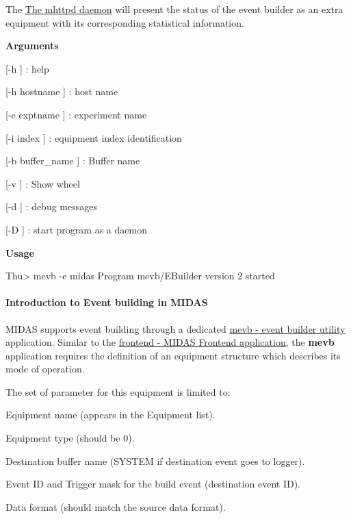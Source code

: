 The \hyperlink{RC_mhttpd_utility}{The mhttpd daemon} will present the status of the event builder as an extra equipment with its corresponding statistical information.


\begin{DoxyItemize}
\item {\bfseries  Arguments }
\begin{DoxyItemize}
\item \mbox{[}-\/h \mbox{]} : help
\item \mbox{[}-\/h hostname \mbox{]} : host name
\item \mbox{[}-\/e exptname \mbox{]} : experiment name
\item \mbox{[}-\/i index \mbox{]} : equipment index identification
\item \mbox{[}-\/b buffer\_\-name \mbox{]} : Buffer name
\item \mbox{[}-\/v \mbox{]} : Show wheel
\item \mbox{[}-\/d \mbox{]} : debug messages
\item \mbox{[}-\/D \mbox{]} : start program as a daemon
\end{DoxyItemize}
\item {\bfseries  Usage } 
\begin{DoxyCode}
  Thu> mevb -e midas
  Program mevb/EBuilder version 2 started
\end{DoxyCode}

\end{DoxyItemize}

\par


\par
 \label{FE_Event_Builder_idx_event_builder}
\hypertarget{FE_Event_Builder_idx_event_builder}{}
\hypertarget{FE_Event_Builder_FE_eb}{}\paragraph{Introduction to Event building in MIDAS}\label{FE_Event_Builder_FE_eb}
MIDAS supports event building through a dedicated \hyperlink{FE_Event_Builder_FE_mevb_utility}{mevb -\/ event builder utility} application. Similar to the \hyperlink{FrontendOperation_FE_frontend_utility}{frontend -\/ MIDAS Frontend application}, the {\bfseries mevb} application requires the definition of an equipment structure which describes its mode of operation. \par
The set of parameter for this equipment is limited to:
\begin{DoxyItemize}
\item Equipment name (appears in the Equipment list).
\item Equipment type (should be 0).
\item Destination buffer name (SYSTEM if destination event goes to logger).
\item Event ID and Trigger mask for the build event (destination event ID).
\item Data format (should match the source data format).
\end{DoxyItemize}

